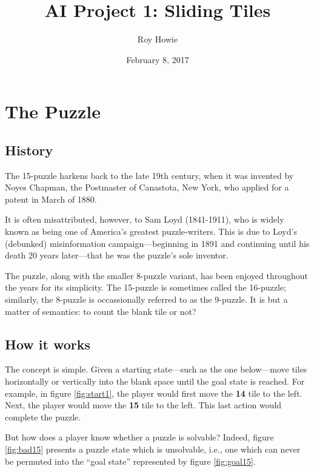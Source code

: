 \documentclass{article}
\begin{document}
\title{AI Project 1: Sliding Tiles}
\author{Roy Howie}
\date{February 8, 2017}
\maketitle

\section*{The Puzzle}
  \subsection*{History}
    The 15-puzzle harkens back to the late 19th century, when it was invented by
    Noyes Chapman, the Postmaster of Canastota, New York, who applied for a
    patent in March of 1880.

    It is often misattributed, however, to Sam Loyd (1841-1911), who is widely
    known as being one of America's greatest puzzle-writers. This is due to
    Loyd's (debunked) misinformation campaign---beginning in 1891 and continuing
    until his death 20 years later---that he was the puzzle's sole inventor.

    The puzzle, along with the smaller 8-puzzle variant, has been enjoyed
    throughout the years for its simplicity. The 15-puzzle is sometimes called
    the 16-puzzle; similarly, the 8-puzzle is occassionally referred to as the
    9-puzzle. It is but a matter of semantics: to count the blank tile or not?

  \subsection*{How it works}
    The concept is simple. Given a starting state---such as the one below---move
    tiles horizontally or vertically into the blank space until the goal state
    is reached. For example, in figure \ref{fig:start1}, the player would first
    move the \textbf{14} tile to the left. Next, the player would move the
    \textbf{15} tile to the left. This last action would complete the puzzle.

    But how does a player know whether a puzzle is solvable? Indeed, figure
    \ref{fig:bad15} presents a puzzle state which is unsolvable, i.e., one which
    can never be permuted into the ``goal state'' represented by figure
    \ref{fig:goal15}.

  
\end{document}
